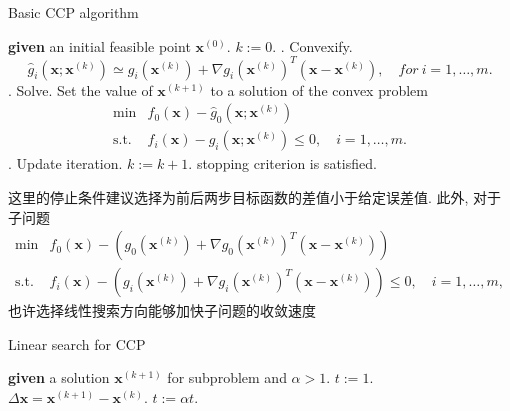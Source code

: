 \documentclass[a4paper,12pt]{article}
\begin{document}
\begin{algorithm}[H]
\caption{Basic CCP algorithm}
\begin{algorithmic}
\STATE \textbf{given} an initial feasible point $\bm{x}^{(0)}$.
\STATE $k:=0$.
\REPEAT
{}. Convexify. 
\begin{displaymath}
\hat{g}_i(\bm{x};\bm{x}^{(k)}) \simeq g_i(\bm{x}^{(k)}) + \nabla g_i(\bm{x}^{(k)})^T(\bm{x}-\bm{x}^{(k)}), \quad for~i = 1,\dots,m.
\end{displaymath}
. Solve. Set the value of $\bm{x}^{(k+1)}$ to a solution of the convex problem
\begin{equation}
\begin{array}{cl}
{\min} & {f_0(\bm{x})-\hat{g}_0(\bm{x};\bm{x}^{(k)})} \\
{\text{s.t.}} & {f_i(\bm{x})-\hat{g}_i(\bm{x};\bm{x}^{(k)}) \leq 0,\quad i=1,\dots,m.}
\end{array}
\end{equation} 
. Update iteration. $k:=k+1$.
\UNTIL stopping criterion is satisfied.
\end{algorithmic}
\end{algorithm}

这里的停止条件建议选择为前后两步目标函数的差值小于给定误差值.
此外, 对于子问题
\begin{equation}
\begin{array}{cl}
{\min} & {f_0(\bm{x}) - \left(g_0(\bm{x}^{(k)}) + \nabla g_0(\bm{x}^{(k)})^T(\bm{x}-\bm{x}^{(k)}) \right)} \\
{\text{s.t.}} &  {f_i(\bm{x}) - \left(g_i(\bm{x}^{(k)}) + \nabla g_i(\bm{x}^{(k)})^T(\bm{x}-\bm{x}^{(k)}) \right) \leq 0,\quad i=1,\dots,m,}
\end{array}
\end{equation}
也许选择线性搜索方向能够加快子问题的收敛速度
\begin{algorithm}[H]
\caption{Linear search for CCP}
\begin{algorithmic}
\STATE \textbf{given} a solution $\bm{x}^{(k+1)}$ for subproblem and $\alpha>1$.
\STATE $t:=1$.
\STATE $\Delta \bm{x} = \bm{x}^{(k+1)} - \bm{x}^{(k)}$.
\STATE $t:=\alpha t$.
\ENDWHILE
\end{algorithmic}
\end{algorithm}
\end{document}
